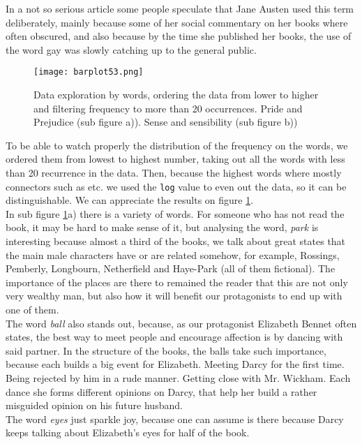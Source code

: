 \documentclass{article}
\begin{document}
In a not so serious article some people speculate that Jane Austen used this term deliberately, mainly because some of her social commentary on her books where often obscured, and also because by the time she published her books, the use of the word gay was slowly catching up to the general public. \\

\begin{figure}[htp]
	\centering
	\texttt{[image: barplot53.png]}
	\caption{Data exploration by words, ordering the data from lower to higher and filtering frequency to more than 20 occurrences. Pride and Prejudice (sub figure a)). Sense and sensibility (sub figure b))}\label{fig3}
\end{figure}

To be able to watch properly the distribution of the frequency on the words, we ordered them from lowest to highest number, taking out all the words with less than 20 recurrence in the data. Then, because the highest words where mostly connectors such as  etc. we used the \texttt{log} value to even out the data, so it can be distinguishable. We can appreciate the results on figure \ref{fig3}.\\

 In sub figure \ref{fig3}a) there is a variety of words. For someone who has not read the book, it may be hard to make sense of it, but analysing the word, \textit{park} is interesting because almost a third of the books, we talk about great states that the main male characters have or are related somehow, for example, Rossings, Pemberly, Longbourn, Netherfield and Haye-Park (all of them fictional). The importance of the places are there to remained the reader that this are not only very wealthy man, but also how it will benefit our protagonists to end up with one of them. \\
 
 The word \textit{ball} also stands out, because, as our protagonist Elizabeth Bennet often states, the best way to meet people and encourage affection is by dancing with said partner. In the structure of the books, the balls take such importance, because each builds a big event for Elizabeth. Meeting Darcy for the first time. Being rejected by him in a rude manner. Getting close with Mr. Wickham. Each dance she forms different opinions on Darcy, that help her build a rather misguided opinion on his future husband.\\
 
 The word \textit{eyes} just sparkle joy, because one can assume is there because Darcy keeps talking about Elizabeth's eyes for half of the book.\\
\end{document}
